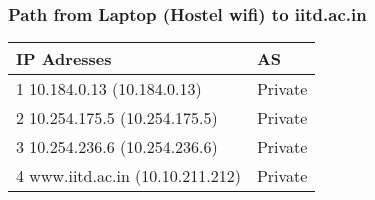 \subsubsection*{Path from Laptop (Hostel wifi) to iitd.ac.in}
\begin{table}[!ht]
    \centering
\begin{tabular}{|l|l|}
\hline
\textbf{IP Adresses}                                                        & \textbf{AS}                                                           \\ \hline
1  10.184.0.13 (10.184.0.13)                                                & Private                                                               \\ \hline
2  10.254.175.5 (10.254.175.5)                                              & Private                                                               \\ \hline
3  10.254.236.6 (10.254.236.6)                                              & Private                                                               \\ \hline
4  www.iitd.ac.in (10.10.211.212)                                           & Private\\ \hline
\end{tabular}
\end{table}
